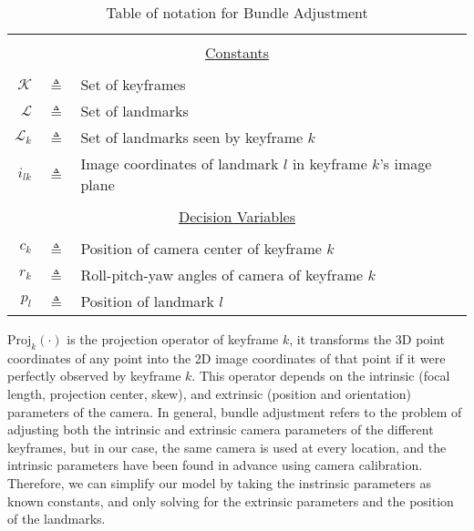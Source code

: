 \begin{table}[H] \caption{Table of notation for Bundle Adjustment}
  \centering
  \begin{tabular}{r c p{10cm} }
  \toprule
  \multicolumn{3}{c}{}\\
  \multicolumn{3}{c}{\underline{Constants}}\\
  \multicolumn{3}{c}{}\\
  $\mathcal{K}$   & $\triangleq$ & Set of keyframes\\
  $\mathcal{L}$   & $\triangleq$ & Set of landmarks\\
  $\mathcal{L}_k$ & $\triangleq$ & Set of landmarks seen by keyframe $k$\\
  $i_{lk}$        & $\triangleq$ & Image coordinates of landmark $l$ in keyframe $k$'s image plane\\
  \multicolumn{3}{c}{}\\
  \multicolumn{3}{c}{\underline{Decision Variables}}\\
  \multicolumn{3}{c}{}\\
  $c_k$           & $\triangleq$ & Position of camera center of keyframe $k$\\
  $r_k$           & $\triangleq$ & Roll-pitch-yaw angles of camera of keyframe $k$\\
  $p_l$           & $\triangleq$ & Position of landmark $l$\\
  \bottomrule
  \end{tabular}
  \label{tab:banotation}
\end{table}

$\mathrm{Proj}_k(\cdot)$ is the projection operator of keyframe $k$, it transforms the 3D point coordinates of any point into the 2D image coordinates of that point if it were perfectly observed by keyframe $k$. This operator depends on the intrinsic (focal length, projection center, skew), and extrinsic (position and orientation) parameters of the camera. In general, bundle adjustment refers to the problem of adjusting both the intrinsic and extrinsic camera parameters of the different keyframes, but in our case, the same camera is used at every location, and the intrinsic parameters have been found in advance using camera calibration. Therefore, we can simplify our model by taking the instrinsic parameters as known constants, and only solving for the extrinsic parameters and the position of the landmarks.

